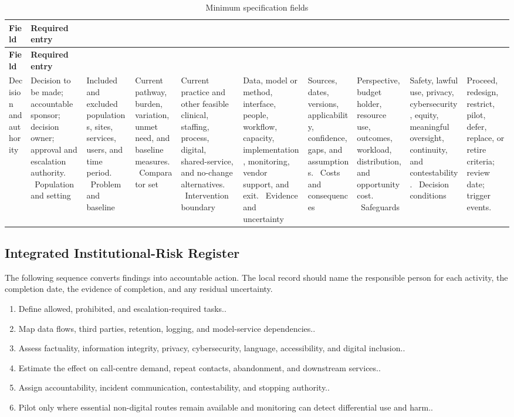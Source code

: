 \begin{longtable}{@{}p{}p{}@{}}
\caption{Minimum specification fields}
\label{tab:comp-ch10-spec-fields}\\
\toprule
\textbf{Field} & \textbf{Required entry} \\
\midrule
\endfirsthead
\toprule
\textbf{Field} & \textbf{Required entry} \\
\midrule
\endhead
\bottomrule
\endlastfoot
Decision and authority & Decision to be made; accountable sponsor; decision owner; approval and escalation authority. \
Population and setting & Included and excluded populations, sites, services, users, and time period. \
Problem and baseline & Current pathway, burden, variation, unmet need, and baseline measures. \
Comparator set & Current practice and other feasible clinical, staffing, process, digital, shared-service, and no-change alternatives. \
Intervention boundary & Data, model or method, interface, people, workflow, capacity, implementation, monitoring, vendor support, and exit. \
Evidence and uncertainty & Sources, dates, versions, applicability, confidence, gaps, and assumptions. \
Costs and consequences & Perspective, budget holder, resource use, outcomes, workload, distribution, and opportunity cost. \
Safeguards & Safety, lawful use, privacy, cybersecurity, equity, meaningful oversight, continuity, and contestability. \
Decision conditions & Proceed, redesign, restrict, pilot, defer, replace, or retire criteria; review date; trigger events. \
\end{longtable}

\subsection{Integrated Institutional-Risk Register}
\label{sec:comp-ch10-supp-2}
The following sequence converts findings into accountable action. The local record
should name the responsible person for each activity, the completion date, the
evidence of completion, and any residual uncertainty.

\begin{enumerate}
 \item Define allowed, prohibited, and escalation-required tasks..
 \item Map data flows, third parties, retention, logging, and model-service dependencies..
 \item Assess factuality, information integrity, privacy, cybersecurity, language, accessibility, and digital inclusion..
 \item Estimate the effect on call-centre demand, repeat contacts, abandonment, and downstream services..
 \item Assign accountability, incident communication, contestability, and stopping authority..
 \item Pilot only where essential non-digital routes remain available and monitoring can detect differential use and harm..
\end{enumerate}

